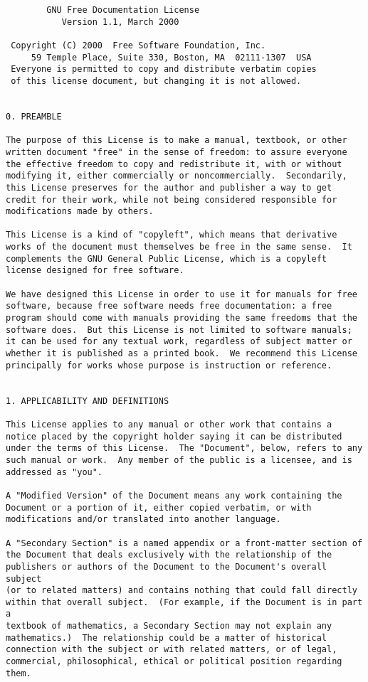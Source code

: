 \documentclass{report}
\begin{document}
\begin{verbatim}
		GNU Free Documentation License
		   Version 1.1, March 2000

 Copyright (C) 2000  Free Software Foundation, Inc.
     59 Temple Place, Suite 330, Boston, MA  02111-1307  USA
 Everyone is permitted to copy and distribute verbatim copies
 of this license document, but changing it is not allowed.


0. PREAMBLE

The purpose of this License is to make a manual, textbook, or other
written document "free" in the sense of freedom: to assure everyone
the effective freedom to copy and redistribute it, with or without
modifying it, either commercially or noncommercially.  Secondarily,
this License preserves for the author and publisher a way to get
credit for their work, while not being considered responsible for
modifications made by others.

This License is a kind of "copyleft", which means that derivative
works of the document must themselves be free in the same sense.  It
complements the GNU General Public License, which is a copyleft
license designed for free software.

We have designed this License in order to use it for manuals for free
software, because free software needs free documentation: a free
program should come with manuals providing the same freedoms that the
software does.  But this License is not limited to software manuals;
it can be used for any textual work, regardless of subject matter or
whether it is published as a printed book.  We recommend this License
principally for works whose purpose is instruction or reference.


1. APPLICABILITY AND DEFINITIONS

This License applies to any manual or other work that contains a
notice placed by the copyright holder saying it can be distributed
under the terms of this License.  The "Document", below, refers to any
such manual or work.  Any member of the public is a licensee, and is
addressed as "you".

A "Modified Version" of the Document means any work containing the
Document or a portion of it, either copied verbatim, or with
modifications and/or translated into another language.

A "Secondary Section" is a named appendix or a front-matter section of
the Document that deals exclusively with the relationship of the
publishers or authors of the Document to the Document's overall subject
(or to related matters) and contains nothing that could fall directly
within that overall subject.  (For example, if the Document is in part a
textbook of mathematics, a Secondary Section may not explain any
mathematics.)  The relationship could be a matter of historical
connection with the subject or with related matters, or of legal,
commercial, philosophical, ethical or political position regarding
them.


\end{verbatim}
\end{document}
